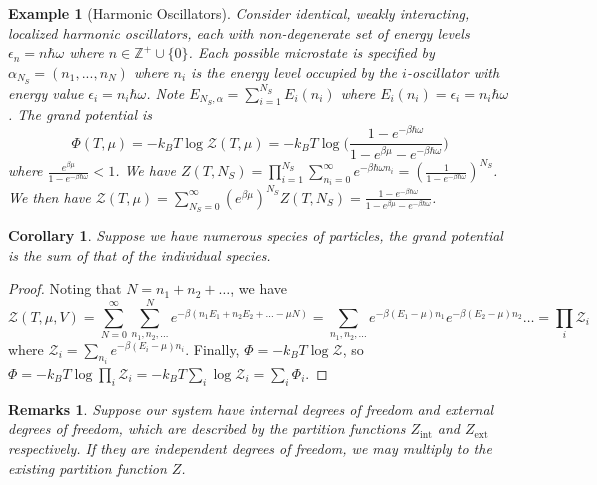 \documentclass[a4paper]{article}
\newtheorem{eg}{Example}[section]
\newtheorem{remarks}{Remarks}[section]
\theoremstyle{new}
\newtheorem{cor}{Corollary}[section]
\begin{document}
\begin{eg}[Harmonic Oscillators]
Consider identical, weakly interacting, localized harmonic oscillators, each with non-degenerate set of energy levels $\epsilon_n=n\hbar\omega$ where $n\in\mathbb{Z}^+\cup\{0\}$. Each possible microstate is specified by $\alpha_{N_S}=(n_1,...,n_N)$ where $n_i$ is the energy level occupied by the $i$-oscillator with energy value $\epsilon_i=n_i\hbar\omega$. Note $E_{N_S,\alpha}=\sum_{i=1}^{N_S}E_i(n_i)$ where $E_i(n_i)=\epsilon_i=n_i\hbar\omega$. The grand potential is
$$\Phi(T,\mu)=-k_BT\log\mathcal{Z}(T,\mu)=-k_BT\log\bigg(\frac{1-e^{-\beta\hbar\omega}}{1-e^{\beta\mu}-e^{-\beta\hbar\omega}}\bigg)$$
where $\frac{e^{\beta\mu}}{1-e^{-\beta\hbar\omega}}<1$. We have $Z(T,N_S)=\prod_{i=1}^{N_S}\sum_{n_i=0}^\infty e^{-\beta\hbar\omega n_i}=(\frac{1}{1-e^{-\beta\hbar\omega}})^{N_S}$. We then have $\mathcal{Z}(T,\mu)=\sum_{N_S=0}^\infty (e^{\beta\mu})^{N_S}Z(T,N_S)=\frac{1-e^{-\beta\hbar\omega}}{1-e^{\beta\mu}-e^{-\beta\hbar\omega}}$.
\end{eg}
\begin{cor}
Suppose we have numerous species of particles, the grand potential is the sum of that of the individual species.
\end{cor}
\begin{proof}
Noting that $N=n_1+n_2+\dots$, we have
$$\mathcal{Z}(T,\mu,V)=\sum_{N=0}^\infty\sum_{n_1,n_2,\dots}^Ne^{-\beta(n_1E_1+n_2E_2+\dots-\mu N)}=\sum_{n_1,n_2,\dots}e^{-\beta(E_1-\mu)n_1}e^{-\beta(E_2-\mu)n_2}\dots=\prod_i\mathcal{Z}_i$$
where $\mathcal{Z}_i=\sum_{n_i}e^{-\beta(E_i-\mu)n_i}$. Finally, $\Phi=-k_BT\log\mathcal{Z}$, so $\Phi=-k_BT\log\prod_i\mathcal{Z}_i=-k_BT\sum_i\log\mathcal{Z}_i=\sum_i\Phi_i$.
\end{proof}
\begin{remarks}
Suppose our system have internal degrees of freedom and external degrees of freedom, which are described by the partition functions $Z_{\text{int}}$ and $Z_{\text{ext}}$ respectively. If they are independent degrees of freedom, we may multiply to the existing partition function $Z$.
\end{remarks}
\end{document}
